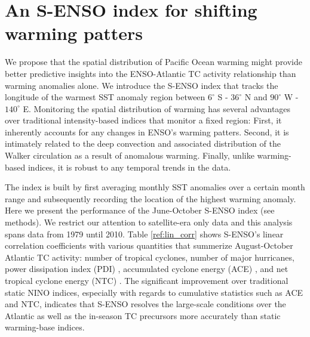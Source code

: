 \section{An S-ENSO index for shifting warming patters}
We propose that the spatial distribution of Pacific Ocean warming might provide better predictive insights into the ENSO-Atlantic TC activity relationship than warming anomalies alone. We introduce the S-ENSO index that tracks the longitude of the warmest SST anomaly region between $6^\circ$ S - $36^\circ$ N and $90^\circ$ W - $140^\circ$ E. Monitoring the spatial distribution of warming has several advantages over traditional intensity-based indices that monitor a fixed region: First, it inherently accounts for any changes in ENSO's warming patters. Second, it is intimately related to the deep convection and associated distribution of the Walker circulation as a result of anomalous warming. Finally, unlike warming-based indices, it is robust to any temporal trends in the data.

The index is built by first averaging monthly SST anomalies over a certain month range and subsequently recording the location of the highest warming anomaly. Here we present the performance of the June-October S-ENSO index (see methods). We restrict our attention to satellite-era only data and this analysis spans data from 1979 until 2010. Table \ref{ref:lin_corr} shows S-ENSO's linear correlation coefficients with various quantities that summerize August-October Atlantic TC activity: number of tropical cyclones, number of major hurricanes, power dissipation index (PDI) \cite{emanuel2005a}, accumulated cyclone energy (ACE) \cite{Bell2000}, and net tropical cyclone energy (NTC) \cite{goldenberg2001}. The significant improvement over traditional static NINO indices, especially with regards to cumulative statistics such as ACE and NTC, indicates that S-ENSO resolves the large-scale conditions over the Atlantic as well as the in-season TC precursors more accurately than static warming-base indices.

